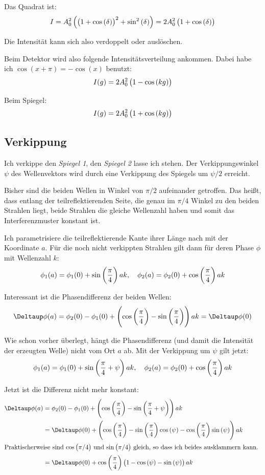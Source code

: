 Das Quadrat ist:
\[
	I = A_0^2 \del{\del{1 + \cos\del\delta}^2 + \sin^2\del\delta}
	= 2 A_0^2 \del{1 + \cos\del\delta}
\]

Die Intensität kann sich also verdoppelt oder auslöschen.

Beim Detektor wird also folgende Intensitätsverteilung ankommen. Dabei habe ich
$\cos(x + \pi) = - \cos(x)$ benutzt:
\[
	I(g) = 2 A_0^2 \del{1 - \cos\del{kg}}
\]

Beim Spiegel:
\[
	I(g) = 2 A_0^2 \del{1 + \cos\del{kg}}
\]

\subsection{Verkippung}

Ich verkippe den \emph{Spiegel 1}, den \emph{Spiegel 2} lasse ich stehen. Der
Verkippungswinkel $\psi$ des Wellenvektors wird durch eine Verkippung des
Spiegels um $\psi/2$ erreicht.

Bisher sind die beiden Wellen in Winkel von $\pi/2$ aufeinander getroffen. Das
heißt, dass entlang der teilreflektierenden Seite, die genau im $\pi/4$ Winkel
zu den beiden Strahlen liegt, beide Strahlen die gleiche Wellenzahl haben und
somit das Interferenzmuster konstant ist.

Ich parametrisiere die teilreflektierende Kante ihrer Länge nach mit der
Koordinate $a$. Für die noch nicht verkippten Strahlen gilt dann für deren
Phase $\phi$ mit Wellenzahl $k$:
\[
	\phi_1(a) = \phi_1(0) + \sin\del{\frac \pi 4} ak
	,\quad
	\phi_2(a) = \phi_2(0) + \cos\del{\frac \pi 4} ak
\]

Interessant ist die Phasendifferenz der beiden Wellen:
\[
	\Deltaup \phi(a)
	= \phi_2(0) - \phi_1(0) + \del{\cos\del{\frac \pi 4} - \sin\del{\frac \pi 4}} ak
	= \Deltaup \phi(0)
\]

Wie schon vorher überlegt, hängt die Phasendifferenz (und damit die Intensität der erzeugten Welle) nicht vom Ort $a$ ab. Mit der Verkippung um $\psi$ gilt jetzt:
\[
	\phi_1(a) = \phi_1(0) + \sin\del{\frac \pi 4 + \psi} ak
	,\quad
	\phi_2(a) = \phi_2(0) + \cos\del{\frac \pi 4} ak
\]

Jetzt ist die Differenz nicht mehr konstant:
\begin{align*}
	\Deltaup \phi(a)
	&= \phi_2(0) - \phi_1(0) + \del{\cos\del{\frac \pi 4} - \sin\del{\frac \pi 4 + \psi}} ak \\
	&= \Deltaup \phi(0) + \del{\cos\del{\frac \pi 4} - \sin\del{\frac \pi 4}\cos\del\psi - \cos\del{\frac \pi 4}\sin\del\psi} ak \\
	\intertext{%
		Praktischerweise sind $\cos\del{\pi/4}$ und $\sin\del{\pi/ 4}$ gleich,
		so dass ich beides ausklammern kann.
	}
	&= \Deltaup \phi(0) + \cos\del{\frac \pi 4} \del{1 - \cos\del\psi - \sin\del\psi} ak
\end{align*}

